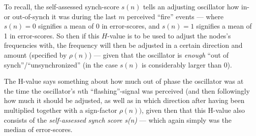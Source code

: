 
		To recall, the self-assessed synch-score $s(n)$ tells an adjusting oscillator how in- or out-of-synch it was during the last $m$ perceived ``fire'' events — where $s(n)=0$ signifies a mean of 0 in error-scores, and $s(n)=1$ signifies a mean of 1 in error-scores. So then if this $H$-value is to be used to adjust the nodes's frequencies with, the frequency will then be adjusted in a certain direction and amount (specified by $\rho(n)$) — given that the oscillator is \textit{enough} ``out of synch''/``unsynchronized'' (in the case $s(n)$ is considerably larger than 0).

		The H-value says something about how much out of phase the oscillator was at the time the oscillator's $n$th ``flashing''-signal was perceived (and then followingly how much it should be adjusted, as well as in which direction after having been multiplied together with a sign-factor $\rho(n))$, given then that this H-value also consists of the \textit{self-assessed synch score s(n)} — which again simply was the median of error-scores.

